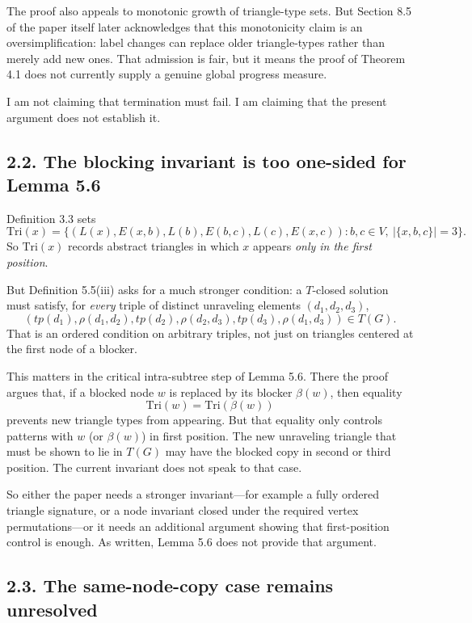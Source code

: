 \documentclass[11pt]{article}
\newcommand{\Tri}{\mathrm{Tri}}
\begin{document}
The proof also appeals to monotonic growth of triangle-type sets. But Section 8.5 of the paper itself later acknowledges that this monotonicity claim is an oversimplification: label changes can replace older triangle-types rather than merely add new ones. That admission is fair, but it means the proof of Theorem 4.1 does not currently supply a genuine global progress measure.

I am not claiming that termination must fail. I am claiming that the present argument does not establish it.

\subsection*{2.2. The blocking invariant is too one-sided for Lemma 5.6}

Definition 3.3 sets
\[
\Tri(x)=\{(L(x),E(x,b),L(b),E(b,c),L(c),E(x,c)) : b,c\in V,\ |\{x,b,c\}|=3\}.
\]
So \(\Tri(x)\) records abstract triangles in which \(x\) appears \emph{only in the first position}.

But Definition 5.5(iii) asks for a much stronger condition: a \(T\)-closed solution must satisfy, for \emph{every} triple of distinct unraveling elements \((d_1,d_2,d_3)\),
\[
(tp(d_1),\rho(d_1,d_2),tp(d_2),\rho(d_2,d_3),tp(d_3),\rho(d_1,d_3))\in T(G).
\]
That is an ordered condition on arbitrary triples, not just on triangles centered at the first node of a blocker.

This matters in the critical intra-subtree step of Lemma 5.6. There the proof argues that, if a blocked node \(w\) is replaced by its blocker \(\beta(w)\), then equality
\[
\Tri(w)=\Tri(\beta(w))
\]
prevents new triangle types from appearing. But that equality only controls patterns with \(w\) (or \(\beta(w)\)) in first position. The new unraveling triangle that must be shown to lie in \(T(G)\) may have the blocked copy in second or third position. The current invariant does not speak to that case.

So either the paper needs a stronger invariant---for example a fully ordered triangle signature, or a node invariant closed under the required vertex permutations---or it needs an additional argument showing that first-position control is enough. As written, Lemma 5.6 does not provide that argument.

\subsection*{2.3. The same-node-copy case remains unresolved}
\end{document}
